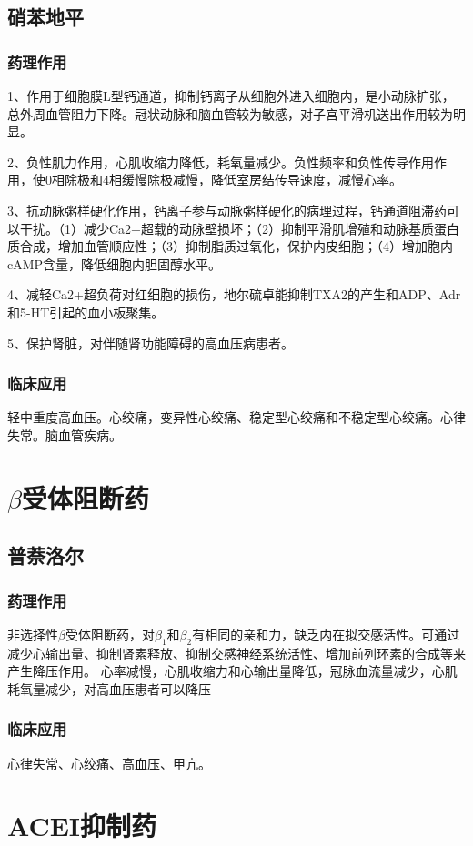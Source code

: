 \documentclass[UTF8]{ctexbook}
\begin{document}
\subsection{硝苯地平}
\subsubsection{药理作用}
1、作用于细胞膜L型钙通道，抑制钙离子从细胞外进入细胞内，是小动脉扩张，总外周血管阻力下降。冠状动脉和脑血管较为敏感，对子宫平滑机送出作用较为明显。

2、负性肌力作用，心肌收缩力降低，耗氧量减少。负性频率和负性传导作用作用，使0相除极和4相缓慢除极减慢，降低室房结传导速度，减慢心率。

3、抗动脉粥样硬化作用，钙离子参与动脉粥样硬化的病理过程，钙通道阻滞药可以干扰。（1）减少Ca2+超载的动脉壁损坏；（2）抑制平滑肌增殖和动脉基质蛋白质合成，增加血管顺应性；（3）抑制脂质过氧化，保护内皮细胞；（4）增加胞内cAMP含量，降低细胞内胆固醇水平。

4、减轻Ca2+超负荷对红细胞的损伤，地尔硫卓能抑制TXA2的产生和ADP、Adr和5-HT引起的血小板聚集。

5、保护肾脏，对伴随肾功能障碍的高血压病患者。
\subsubsection{临床应用}
轻中重度高血压。心绞痛，变异性心绞痛、稳定型心绞痛和不稳定型心绞痛。心律失常。脑血管疾病。
\section{\(\beta\)受体阻断药}
\subsection{普萘洛尔}
\subsubsection{药理作用}
非选择性\(\beta\)受体阻断药，对\(\beta_{1}\)和\(\beta_{2}\)有相同的亲和力，缺乏内在拟交感活性。可通过减少心输出量、抑制肾素释放、抑制交感神经系统活性、增加前列环素的合成等来产生降压作用。
心率减慢，心肌收缩力和心输出量降低，冠脉血流量减少，心肌耗氧量减少，对高血压患者可以降压
\subsubsection{临床应用}
心律失常、心绞痛、高血压、甲亢。
\section{ACEI抑制药}
\end{document}
